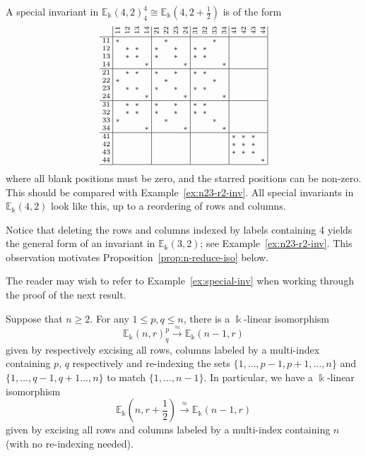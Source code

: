 \documentclass[ALCO,ThmDefs,Unicode,epreuves]{cedram}
\newcommand{\E}{\mathbb{E}}
\newcommand{\fhalf}{\frac{1}{2}} %
\newcommand{\rt}[1]{\rotatebox{90}{#1}}
\begin{document}
\begin{exam}\label{ex:special-inv}
A special invariant in $\E_\Bbbk(4,2)^4_4 \cong \E_\Bbbk(4,2+\fhalf)$
is of the form
\[
\text{\setlength{\arraycolsep}{2.7pt}\scriptsize
$\displaystyle \begin{array}{c|cccc|cccc|cccc|cccc|}
 &\rt{11}&\rt{12}&\rt{13}&\rt{14}&\rt{21}&\rt{22}&\rt{23}&\rt{24}&
 \rt{31}&\rt{32}&\rt{33}&\rt{34}&\rt{41}&\rt{42}&\rt{43}&\rt{44}\\ \hline
 11&*& & & & &*& & & & &*& & & & & \\ 12& &*&*& &*& &*& &*&*& & & & &
 & \\ 13& &*&*& &*& &*& &*&*& & & & & & \\ 14& & & &*& & & &*& & &
 &*& & & & \\ \hline 21& &*&*& &*& &*& &*&*& & & & & & \\ 22&*& & & &
 &*& & & & &*& & & & & \\ 23& &*&*& &*& &*& &*&*& & & & & & \\ 24& &
 & &*& & & &*& & & &*& & & & \\ \hline 31& &*&*& &*& &*& &*&*& & & &
 & & \\ 32& &*&*& &*& &*& &*&*& & & & & & \\ 33&*& & & & &*& & & &
 &*& & & & & \\ 34& & & &*& & & &*& & & &*& & & & \\ \hline 41& & & &
 & & & & & & & & &*&*&*& \\ 42& & & & & & & & & & & & &*&*&*& \\ 43&
 & & & & & & & & & & & &*&*&*& \\ 44& & & & & & & & & & & & & & &
 &*\\ \hline
\end{array}$}
\]
where all blank positions must be zero, and the starred positions can
be non-zero. This should be compared with Example~\ref{ex:n23-r2-inv}.
All special invariants in $\E_\Bbbk(4,2)$ look like this, up to a
reordering of rows and columns.

Notice that deleting the rows and columns indexed by labels containing
4 yields the general form of an invariant in $\E_\Bbbk(3,2)$; see
Example~\ref{ex:n23-r2-inv}. This observation motivates Proposition~\ref{prop:n-reduce-iso} below.
\end{exam}

The reader may wish to refer to Example~\ref{ex:special-inv} when
working through the proof of the next result.

\begin{prop}\label{prop:n-reduce-iso}
Suppose that $n \ge 2$. For any $1 \le p,q \le n$, there is a
$\Bbbk$-linear isomorphism
\[
\E_\Bbbk(n,r)^p_q \xrightarrow{\;\approx\;} \E_\Bbbk(n-1,r)
\]
given by respectively excising all rows, columns labeled by a
multi-index containing $p$, $q$ respectively and re-indexing the sets
$\{1, \dots, p-1, p+1, \dots, n\}$ and $\{1, \dots, q-1, q+1 \dots,
n\}$ to match $\{1, \dots, n-1\}$. In particular, we have a
$\Bbbk$-linear isomorphism
\[
\E_\Bbbk\left(n,r+\fhalf\right) \xrightarrow{\;\approx\;} \E_\Bbbk(n-1,r)
\]
given by excising all rows and columns labeled by a multi-index
containing $n$ (with no re-indexing needed).
\end{prop}
\end{document}
